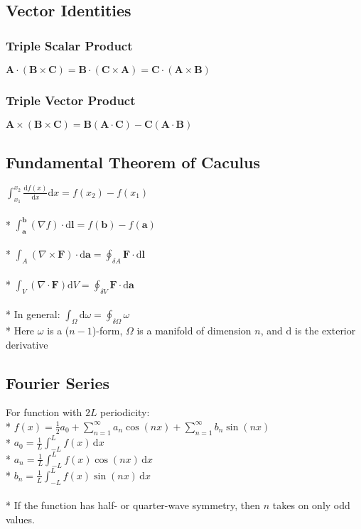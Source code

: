 \subsection{Vector Identities}

\subsubsection{Triple Scalar Product}
\(\mathbf{A}\cdot(\mathbf{B}\times\mathbf{C})=\mathbf{B}\cdot(\mathbf{C}\times\mathbf{A})=\mathbf{C}\cdot(\mathbf{A}\times\mathbf{B})\)

\subsubsection{Triple Vector Product}
\(\mathbf{A}\times(\mathbf{B}\times\mathbf{C})=\mathbf{B}(\mathbf{A}\cdot\mathbf{C})-\mathbf{C}(\mathbf{A}\cdot\mathbf{B})\)

\subsection{Fundamental Theorem of Caculus}
\(\displaystyle \int_{x_1}^{x_2}{\frac{\mathrm{d}f(x)}{\mathrm{d}x}\mathrm{d}x}=f(x_2)-f(x_1)\)\\\\*
\(\displaystyle \int_{\mathbf{a}}^{\mathbf{b}}{(\nabla f)\cdot\mathrm{d}\mathbf{l}}=f(\mathbf{b})-f(\mathbf{a})\)\\\\*
\(\displaystyle \int_{A}{(\nabla\times\mathbf{F})\cdot\mathrm{d}\mathbf{a}}=\oint_{\delta A}{\mathbf{F}\cdot\mathrm{d}\mathbf{l}}\)\\\\*
\(\displaystyle \int_{V}{(\nabla\cdot\mathbf{F})\mathrm{d}V}=\oint_{\delta V}{\mathbf{F}\cdot\mathrm{d}\mathbf{a}}\)\\\\*
In general: \(\displaystyle\int_{\Omega}{\mathrm{d}\omega}=\oint_{\delta\Omega}{\omega}\)\\*
Here \(\omega\) is a (\(n-1\))-form, \(\Omega\) is a manifold of dimension \(n\), and \(\mathrm{d}\) is the exterior derivative

\subsection{Fourier Series}
For function with \(2L\) periodicity:\\*
\(\displaystyle f(x)=\frac{1}{2}a_0+\sum_{n=1}^\infty a_n\cos(nx)+\sum_{n=1}^\infty b_n\sin(nx)\)\\*
\(\displaystyle a_0=\frac{1}{L}\int_{-L}^{L}f(x)\,\mathrm{d}x\)\\*
\(\displaystyle a_n=\frac{1}{L}\int_{-L}^{L}f(x)\cos(nx)\,\mathrm{d}x\)\\*
\(\displaystyle b_n=\frac{1}{L}\int_{-L}^{L}f(x)\sin(nx)\,\mathrm{d}x\)\\\\*
If the function has half- or quarter-wave symmetry, then \(n\) takes on only odd values.

